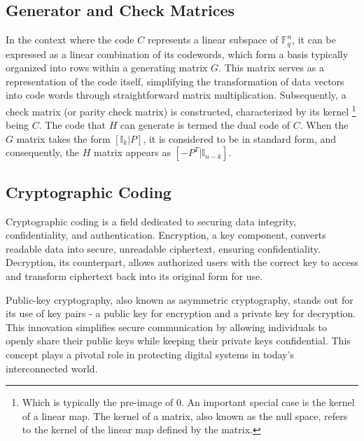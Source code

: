 \subsection{Generator and Check Matrices}
In the context where the code $C$ represents a linear subspace of $\mathbb{F}_q^n$, it can be expressed as a linear combination of its codewords, which form a basis typically organized into rows within a generating matrix $G$. This matrix serves as a representation of the code itself, simplifying the transformation of data vectors into code words through straightforward matrix multiplication. Subsequently, a check matrix (or parity check matrix) is constructed, characterized by its kernel \footnote{Which is typically the pre-image of 0. An important special case is the kernel of a linear map. The kernel of a matrix, also known as the null space, refers to the kernel of the linear map defined by the matrix.} being $C$. The code that $H$ can generate is termed the dual code of $C$. When the $G$ matrix takes the form $[\mathbb{I}_k | P]$, it is considered to be in standard form, and consequently, the $H$ matrix appears as $[-P^T | \mathbb{I}_{n-k}]$.

\subsection{Cryptographic Coding}
Cryptographic coding is a field dedicated to securing data integrity, confidentiality, and authentication. Encryption, a key component, converts readable data into secure, unreadable ciphertext, ensuring confidentiality. Decryption, its counterpart, allows authorized users with the correct key to access and transform ciphertext back into its original form for use.

Public-key cryptography, also known as asymmetric cryptography, stands out for its use of key pairs - a public key for encryption and a private key for decryption. This innovation simplifies secure communication by allowing individuals to openly share their public keys while keeping their private keys confidential. This concept plays a pivotal role in protecting digital systems in today's interconnected world.
